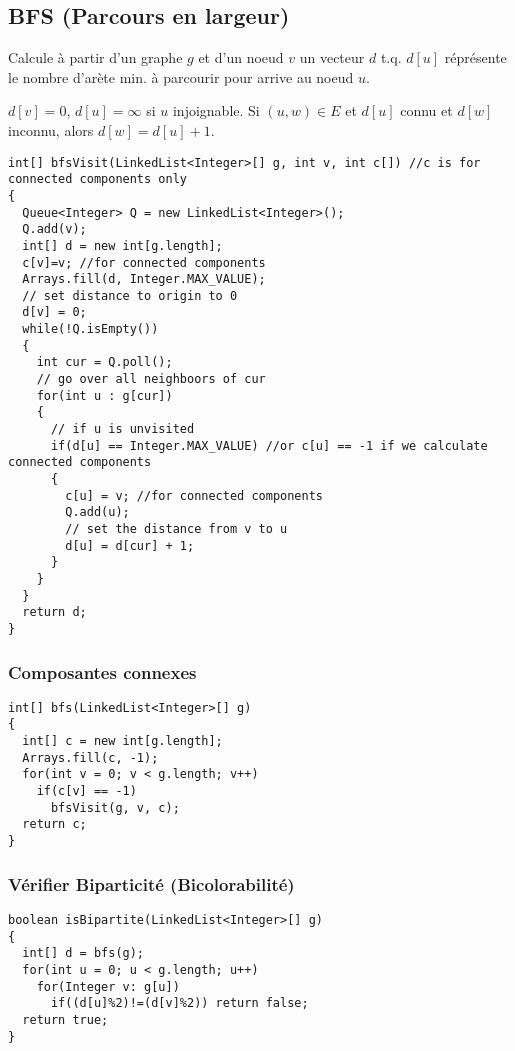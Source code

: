 \subsection{BFS (Parcours en largeur)}
Calcule à partir d'un graphe $g$ et d'un noeud $v$ un vecteur $d$ t.q. $d[u]$ réprésente le nombre d'arète min. à parcourir pour arrive au noeud $u$.

$d[v]=0$, $d[u]=\infty$ si $u$ injoignable. Si $(u, w)\in E$ et $d[u]$ connu et $d[w]$ inconnu, alors $d[w] = d[u]+1$.\\

\begin{lstlisting}
int[] bfsVisit(LinkedList<Integer>[] g, int v, int c[]) //c is for connected components only
{
  Queue<Integer> Q = new LinkedList<Integer>();
  Q.add(v);
  int[] d = new int[g.length];
  c[v]=v; //for connected components
  Arrays.fill(d, Integer.MAX_VALUE);
  // set distance to origin to 0
  d[v] = 0;
  while(!Q.isEmpty())
  {
    int cur = Q.poll();
    // go over all neighboors of cur
    for(int u : g[cur])
    {
      // if u is unvisited
      if(d[u] == Integer.MAX_VALUE) //or c[u] == -1 if we calculate connected components 
      {
      	c[u] = v; //for connected components
        Q.add(u);
        // set the distance from v to u
        d[u] = d[cur] + 1;
      }
    }
  }
  return d;
}
\end{lstlisting}
\subsubsection{Composantes connexes}
\begin{lstlisting}
int[] bfs(LinkedList<Integer>[] g)
{
  int[] c = new int[g.length];
  Arrays.fill(c, -1);
  for(int v = 0; v < g.length; v++)
    if(c[v] == -1)
      bfsVisit(g, v, c);
  return c;
}
\end{lstlisting}
\subsubsection{Vérifier Biparticité (Bicolorabilité)} %
\begin{lstlisting}
boolean isBipartite(LinkedList<Integer>[] g)
{
  int[] d = bfs(g);
  for(int u = 0; u < g.length; u++)
    for(Integer v: g[u])
      if((d[u]%2)!=(d[v]%2)) return false;
  return true;
}
\end{lstlisting}